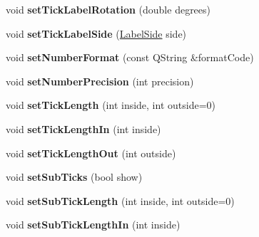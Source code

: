 \begin{DoxyCompactItemize}
\item 
void {\bfseries set\+Tick\+Label\+Rotation} (double degrees)\hypertarget{class_q_c_p_axis_a1bddd4413df8a576b7ad4b067fb33375}{}\label{class_q_c_p_axis_a1bddd4413df8a576b7ad4b067fb33375}

\item 
void {\bfseries set\+Tick\+Label\+Side} (\hyperlink{class_q_c_p_axis_a24b13374b9b8f75f47eed2ea78c37db9}{Label\+Side} side)\hypertarget{class_q_c_p_axis_a13ec644fc6e22715744c92c6dfa4f0fa}{}\label{class_q_c_p_axis_a13ec644fc6e22715744c92c6dfa4f0fa}

\item 
void {\bfseries set\+Number\+Format} (const Q\+String \&format\+Code)\hypertarget{class_q_c_p_axis_ae585a54dc2aac662e90a2ca82f002590}{}\label{class_q_c_p_axis_ae585a54dc2aac662e90a2ca82f002590}

\item 
void {\bfseries set\+Number\+Precision} (int precision)\hypertarget{class_q_c_p_axis_a21dc8023ad7500382ad9574b48137e63}{}\label{class_q_c_p_axis_a21dc8023ad7500382ad9574b48137e63}

\item 
void {\bfseries set\+Tick\+Length} (int inside, int outside=0)\hypertarget{class_q_c_p_axis_a62ec40bebe3540e9c1479a8fd2be3b0d}{}\label{class_q_c_p_axis_a62ec40bebe3540e9c1479a8fd2be3b0d}

\item 
void {\bfseries set\+Tick\+Length\+In} (int inside)\hypertarget{class_q_c_p_axis_afae1a37a99611366275a51204d991739}{}\label{class_q_c_p_axis_afae1a37a99611366275a51204d991739}

\item 
void {\bfseries set\+Tick\+Length\+Out} (int outside)\hypertarget{class_q_c_p_axis_a3b8a0debd1ffedd2c22d0592dfbb4e62}{}\label{class_q_c_p_axis_a3b8a0debd1ffedd2c22d0592dfbb4e62}

\item 
void {\bfseries set\+Sub\+Ticks} (bool show)\hypertarget{class_q_c_p_axis_afa0ce8d4d0015ed23dcde01f8bc30106}{}\label{class_q_c_p_axis_afa0ce8d4d0015ed23dcde01f8bc30106}

\item 
void {\bfseries set\+Sub\+Tick\+Length} (int inside, int outside=0)\hypertarget{class_q_c_p_axis_ab702d6fd42fc620607435339a1c2a2e1}{}\label{class_q_c_p_axis_ab702d6fd42fc620607435339a1c2a2e1}

\item 
void {\bfseries set\+Sub\+Tick\+Length\+In} (int inside)\hypertarget{class_q_c_p_axis_ac46fa2a993a9f5789540977610acf1de}{}\label{class_q_c_p_axis_ac46fa2a993a9f5789540977610acf1de}


\end{DoxyCompactItemize}
